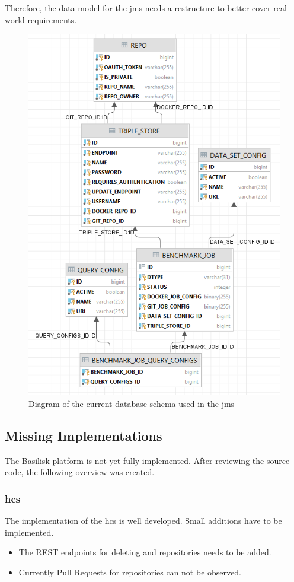 Therefore, the data model for the \ac{jms} needs a restructure to better cover real world requirements.

\begin{figure}[tbph]
	\centering
	\includegraphics[width=.7\textwidth]{figures/jms_db_schema.png}
	\caption{Diagram of the current database schema used in the \ac{jms}}
	\label{fig:jms_db_schema}
\end{figure}



\subsection{Missing Implementations}
\label{sec:review_missing_impl}
The Basilisk platform is not yet fully implemented.
After reviewing the source code, the following overview was created.

\subsubsection{\acl{hcs}}
The implementation of the \acl{hcs} is well developed.
Small additions have to be implemented.

\begin{itemize}
	\item The REST endpoints for deleting \gh{} and \dockh{} repositories needs to be added.
	
	\item Currently Pull Requests for \gh{} repositories can not be observed.
\end{itemize}


